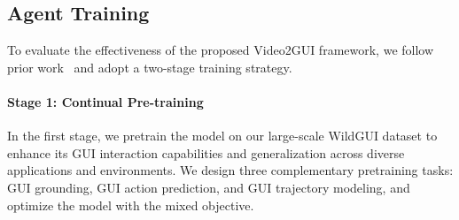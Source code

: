 \documentclass{article}
\theoremstyle{plain}
\theoremstyle{definition}
\theoremstyle{remark}
\begin{document}


\subsection{Agent Training}
\label{subsec: agent tuning}

To evaluate the effectiveness of the proposed Video2GUI framework, we follow prior work~\citep{xu2024aguvis, wang2025opencua} and adopt a two-stage training strategy.

\paragraph{Stage 1: Continual Pre-training}

In the first stage, we pretrain the model on our large-scale WildGUI dataset to enhance its GUI interaction capabilities and generalization across diverse applications and environments. We design three complementary pretraining tasks: GUI grounding, GUI action prediction, and GUI trajectory modeling, and optimize the model with the mixed objective.
\end{document}
